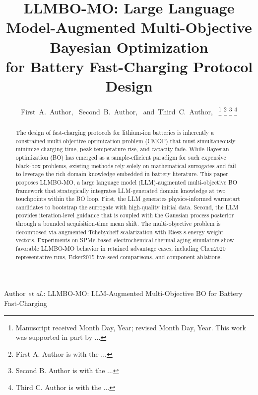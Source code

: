 \documentclass[journal]{IEEEtran}
\begin{document}
\title{
LLMBO-MO: Large Language Model-Augmented Multi-Objective Bayesian Optimization \\
for Battery Fast-Charging Protocol Design
}

\author{
First~A.~Author,~
Second~B.~Author,~
and~Third~C.~Author,~%
\thanks{Manuscript received Month Day, Year; revised Month Day, Year.
This work was supported in part by ...}
\thanks{First A. Author is with the ...}
\thanks{Second B. Author is with the ...}
\thanks{Third C. Author is with the ...}
}

%
{Author \MakeLowercase{\textit{et al.}}: LLMBO-MO: LLM-Augmented Multi-Objective BO for Battery Fast-Charging}

\maketitle

\begin{abstract}
The design of fast-charging protocols for lithium-ion batteries is inherently
a constrained multi-objective optimization problem (CMOP) that must simultaneously
minimize charging time, peak temperature rise, and capacity fade.
While Bayesian optimization (BO) has emerged as a sample-efficient paradigm
for such expensive black-box problems, existing methods rely solely on
mathematical surrogates and fail to leverage the rich domain knowledge
embedded in battery literature.
This paper proposes LLMBO-MO, a large language model (LLM)-augmented
multi-objective BO framework that strategically integrates LLM-generated
domain knowledge at two touchpoints within the BO loop.
First, the LLM generates physics-informed warmstart candidates to bootstrap
the surrogate with high-quality initial data.
Second, the LLM provides iteration-level guidance that is coupled with
the Gaussian process posterior through a bounded acquisition-time mean shift.
The multi-objective problem is decomposed via augmented Tchebycheff
scalarization with Riesz s-energy weight vectors.
Experiments on SPMe-based electrochemical-thermal-aging simulators
show favorable LLMBO-MO behavior in retained advantage cases, including
Chen2020 representative runs, Ecker2015 five-seed comparisons, and
component ablations.
\end{abstract}
\end{document}
